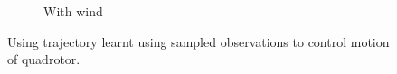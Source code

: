 \documentclass[hidelinks,BTech]{iitmdiss}
\begin{document}
\begin{figure}[H]
\begin{subfigure}[t]{0.48\textwidth}
      \caption{With wind}
  \end{subfigure}
  \caption{Using trajectory learnt using sampled observations to control motion of quadrotor.}
\end{figure}

\begin{singlespace}
  \pagebreak
  \clearpage
  
\end{singlespace}
\end{document}
